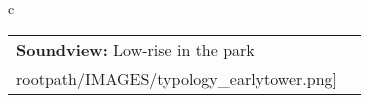 \begin{table}[H]
        \begin{tabular}{c}
        \begin{tabular}{m{1.5in} m{2in}}
\textbf{Soundview:} {Low-rise in the park} & \texttt{[image: \\rootpath/IMAGES/typology\_earlytower.png]}
\end{tabular}\end{tabular}
        \end{table}
